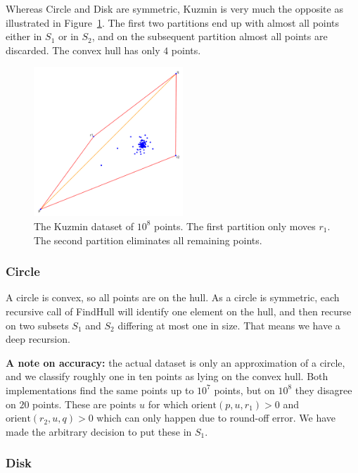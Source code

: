 Whereas Circle and Disk are symmetric, Kuzmin is very much the opposite
as illustrated in Figure~\ref{fig:kuzmin}.
The first two partitions end up with almost all points either in $S_1$ or
in $S_2$, and on the subsequent partition almost all points are discarded.
The convex hull has only $4$ points.

\begin{figure}[ht]
    \centering
    \includegraphics[width=0.5\textwidth]{./figures/rust-kuzmin.png}
    \caption{The Kuzmin dataset of $10^8$ points. The first partition only
             moves $r_1$. The second partition eliminates all remaining points.}
    \label{fig:kuzmin}
\end{figure}

\subsubsection{Circle}

A circle is convex, so all points are on the hull. As a circle is symmetric,
each recursive call of FindHull will identify one element on the hull, and
then recurse on two subsets $S_1$ and $S_2$ differing at most one in size.
That means we have a deep recursion.

\textbf{A note on accuracy: }the actual dataset is only an approximation of
a circle, and we classify roughly one in ten points as lying on the convex
hull. Both implementations find the same points up to $10^7$ points, but on 
$10^8$ they disagree on $20$ points. These are points $u$ for which 
$\text{orient}(p, u, r_1) > 0$ and $\text{orient}(r_2, u, q) > 0$ which
can only happen due to round-off error. We have made the arbitrary decision
to put these in $S_1$.

\subsubsection{Disk}

